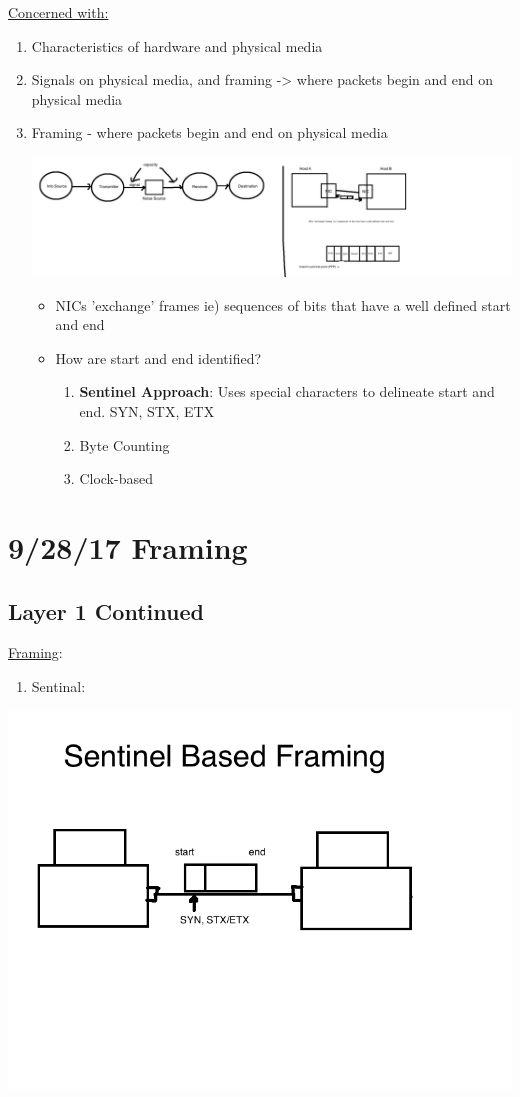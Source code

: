\documentclass[11pt]{article}
\begin{document}
\uline{Concerned with:}
\begin{enumerate}
\item Characteristics of hardware and physical media
\item Signals on physical media, and framing -> where packets begin and end on
physical media
\item Framing - where packets begin and end on physical media

\includegraphics[width=.9\linewidth]{diagrams/fig5.png}
\begin{itemize}
\item NICs 'exchange' frames ie) sequences of bits that have a well defined
start and end
\item How are start and end identified?
\begin{enumerate}
\item \textbf{Sentinel Approach}: Uses special characters to delineate start and
end. SYN, STX, ETX
\item Byte Counting
\item Clock-based
\end{enumerate}
\end{itemize}
\end{enumerate}

\section{9/28/17  Framing}
\label{sec:orgheadline30}
\subsection{Layer 1 Continued}
\label{sec:orgheadline29}

\uline{Framing}:
\begin{enumerate}
\item Sentinal:
\end{enumerate}

\includegraphics[width=.9\linewidth]{diagrams/fig6.png}
\end{document}
